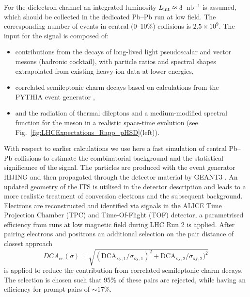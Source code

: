 \documentclass[../report.tex]{subfiles}
\begin{document}
For the dielectron channel an integrated luminosity $L_{\rm int}\approx 3$~nb$^{−1}$ is assumed, which should be collected in the dedicated Pb--Pb run at low field. The corresponding number of events in central (0--10\%) collisions is $2.5 \times 10^{9}$.  
The input for the signal is composed of:
\begin{itemize}
\item contributions from the decays of long-lived light pseudoscalar and vector mesons (hadronic cocktail), with particle ratios and spectral shapes extrapolated from existing heavy-ion data at lower energies,
\item correlated semileptonic charm decays based on calculations from the PYTHIA event generator \cite{},
\item and the radiation of thermal dileptons and a medium-modified spectral function for the \Prho meson in a realistic space-time evolution (see Fig.~\ref{fig:LHCExpectations_Rapp_pHSD}(left)).
\end{itemize}
With respect to earlier calculations \cite{Abelevetal:2014cna,Abelevetal:2014dna,ALICE:2014qrd} we use here a fast simulation of central Pb--Pb collisions to estimate the combinatorial background and the statistical significance of the signal. The particles are produced with the event generator HIJING \cite{} and then propagated through the detector material by GEANT3 \cite{}. An updated geometry of the ITS is utilised in the detector description and leads to a more realistic treatment of conversion electrons and the subsequent background. 
Electrons are reconstructed and identified via signals in the ALICE Time Projection Chamber (TPC) and Time-Of-Flight (TOF) detector, a parametrised efficiency from runs at low magnetic field during LHC Run 2 is applied. After pairing electrons and positrons an additional selection on the pair distance of closest approach 
\begin{equation}
DCA_{ee}(\sigma)=\sqrt{(\mathrm{DCA}_{\mathrm{xy},1}/\sigma_{\mathrm{xy},1})^2+\mathrm{DCA}_{\mathrm{xy},2}/\sigma_{\mathrm{xy},2})^2}
\end{equation}
is applied to reduce the contribution from correlated semileptonic charm decays. The selection is chosen such that 95\% of these pairs are rejected, while having an efficiency for prompt pairs of $\sim17$\%.
\end{document}
